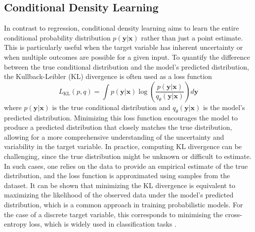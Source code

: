 \subsection{Conditional Density Learning}
In contrast to regression, conditional density learning aims to learn the entire conditional probability distribution $p(\mathbf{y}|\mathbf{x})$ rather than just a point estimate. This is particularly useful when the target variable has inherent uncertainty or when multiple outcomes are possible for a given input. To quantify the difference between the true conditional distribution and the model's predicted distribution, the Kullback-Leibler (KL) divergence is often used as a loss function \cite{kl_divergence}
\begin{equation}
    L_{\text{KL}}(p, q) = \int p(\mathbf{y}|\mathbf{x}) \log \left( \frac{p(\mathbf{y}|\mathbf{x})}{q_\theta(\mathbf{y}|\mathbf{x})} \right) d\mathbf{y}
\end{equation}
where $p(\mathbf{y}|\mathbf{x})$ is the true conditional distribution and $q_\theta(\mathbf{y}|\mathbf{x})$ is the model's predicted distribution. Minimizing this loss function encourages the model to produce a predicted distribution that closely matches the true distribution, allowing for a more comprehensive understanding of the uncertainty and variability in the target variable. In practice, computing KL divergence can be challenging, since the true distribution might be unknown or difficult to estimate. In such cases, one relies on the data to provide an empirical estimate of the true distribution, and the loss function is approximated using samples from the dataset. It can be shown that minimizing the KL divergence is equivalent to maximizing the likelihood of the observed data under the model's predicted distribution, which is a common approach in training probabilistic models. For the case of a discrete target variable, this corresponds to minimising the cross-entropy loss, which is widely used in classification tasks \cite{cross-entropy}.

